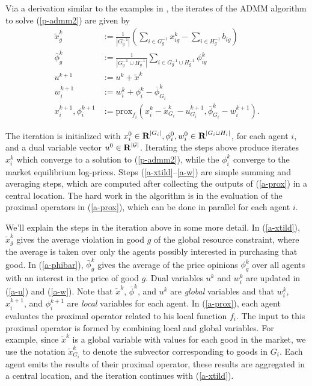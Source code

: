 \documentclass[12pt]{article}
\begin{document}
Via a derivation similar to the examples in \cite{boyd2011distributed},
the iterates of the ADMM algorithm to solve (\ref{p-admm2}) are given by
\begin{align}
\label{a-xtild}
\tilde{x}^k_g &:= \frac{1}{|G^{-1}_g|} \left( \sum_{i \in G^{-1}_g} x^k_{ig} - \sum_{i \in H^{-1}_g} b_{ig}\right)\\
\label{a-phibar}
\bar{\phi}^k_g &:= \frac{1}{ |G^{-1}_g \cup H^{-1}_g| } \sum_{i \in G^{-1}_g \cup H^{-1}_g}\phi^k_{ig}\\
\label{a-u}
u^{k+1} &:= u^k + \tilde{x}^k\\
\label{a-w}
w_i^{k+1} &:= w_i^k + \phi^k_i - \bar{\phi}^k_{G_i}\\
\label{a-prox}
x_i^{k+1}, \phi_i^{k+1} &:= \mbox{prox}_{f_i}(x_i^k - \tilde{x}^k_{G_i} - u^{k+1}_{G_i},
\bar{\phi}^k_{G_i} - w_i^{k+1}).
\end{align}

The iteration is initialized with $x^0_i \in {\mbox{\bf R}}^{|G_i|}, \phi^0_i, w^0_i
\in {\mbox{\bf R}}^{|G_i \cup H_i|}$, for each agent $i$, and a dual variable vector
$u^0 \in {\mbox{\bf R}}^{|\mathcal{G}|}$. Iterating the steps above produce iterates
$x^k_i$ which converge to a solution to (\ref{p-admm2}), while the $\phi^k_i$
converge to the market equilibrium log-prices. Steps (\ref{a-xtild}--\ref{a-w})
are simple summing and averaging steps, which are computed after collecting the
outputs of (\ref{a-prox}) in a central location. The hard work in the algorithm
is in the evaluation of the proximal operators in (\ref{a-prox}), which can be
done in parallel for each agent $i$.

We'll explain the steps in the iteration above in some more detail. In (\ref{a-xtild}),
$\tilde{x}^k_g$ gives the average violation in good $g$ of the global resource
constraint, where the average is taken over only the agents possibly interested
in purchasing that good. In (\ref{a-phibar}), $\bar{\phi}^k_g$ gives the
average of the price opinions $\phi^k_g$ over all agents with an interest in
the price of good $g$. Dual variables $u^k$ and $w^k_i$ are updated in
(\ref{a-u}) and (\ref{a-w}). Note that $\tilde{x}^k$, $\bar{\phi}^k$, and $u^k$
are \emph{global} variables and that $w_i^k$, $x_i^{k+1}$, and $\phi_i^{k+1}$
are \emph{local} variables for each agent. In (\ref{a-prox}), each
agent evaluates the proximal operator related to his local function $f_i$. The
input to this proximal operator is formed by combining local and global
variables. For example, since $\tilde{x}^k$ is a global variable with values
for each good in the market, we use the notation $\tilde{x}^k_{G_i}$ to denote
the subvector corresponding to goods in $G_i$. Each agent emits the results of
their proximal operator, these results are aggregated
in a central location, and the iteration continues with (\ref{a-xtild}).
\end{document}

